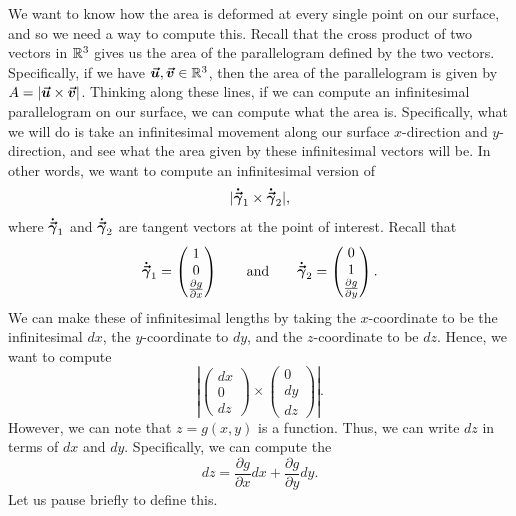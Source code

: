                                       We want to know how the area is deformed at every single point on our surface, and so we need a way to compute this.  Recall that the cross product of two vectors in $\mathbb{R}^3$ gives us the area of the parallelogram defined by the two vectors.  Specifically, if we have $\boldsymbol{\boldsymbol{\vec{u}}},\boldsymbol{\boldsymbol{\vec{v}}} \in \mathbb{R}^3$, then the area of the parallelogram is given by $A=|\boldsymbol{\boldsymbol{\vec{u}}}\times \boldsymbol{\boldsymbol{\vec{v}}}|$.  Thinking along these lines, if we can compute an infinitesimal parallelogram on our surface, we can compute what the area is.  Specifically, what we will do is take an infinitesimal movement along our surface $x$-direction and $y$-direction, and see what the area given by these infinitesimal vectors will be.  In other words, we want to compute an infinitesimal version of
                                      \[
                                      |\boldsymbol{\dot{\vec{\gamma}}}_1 \times \boldsymbol{\dot{\vec{\gamma}}}_2|,
                                      \]
                                      where $\boldsymbol{\dot{\vec{\gamma}}}_1$ and $\boldsymbol{\dot{\vec{\gamma}}}_2$ are tangent vectors at the point of interest.  Recall that
                                      \[
                                      \boldsymbol{\dot{\vec{\gamma}}}_1 = \begin{pmatrix} 1 \\ 0 \\ \frac{\partial g}{\partial x} \end{pmatrix}  \qquad \textrm{and} \qquad  \boldsymbol{\dot{\vec{\gamma}}}_2 = \begin{pmatrix} 0 \\ 1 \\ \frac{\partial g}{\partial y} \end{pmatrix}.
                                      \]
                                      We can make these of infinitesimal lengths by taking the $x$-coordinate to be the infinitesimal $dx$, the $y$-coordinate to $dy$, and the $z$-coordinate to be $dz$.  Hence, we want to compute
                                      \[
                                      \left| \begin{pmatrix} dx \\ 0 \\ dz \end{pmatrix} \times \begin{pmatrix} 0 \\ dy \\ dz \end{pmatrix} \right|. 
                                      \]
                                      However, we can note that $z=g(x,y)$ is a function. Thus, we can write $dz$ in terms of $dx$ and $dy$.  Specifically, we can compute the  
                                      \[
                                      dz = \frac{\partial g}{\partial x}dx + \frac{\partial g}{\partial y}dy.
                                      \]
                                      Let us pause briefly to define this.
                                      
